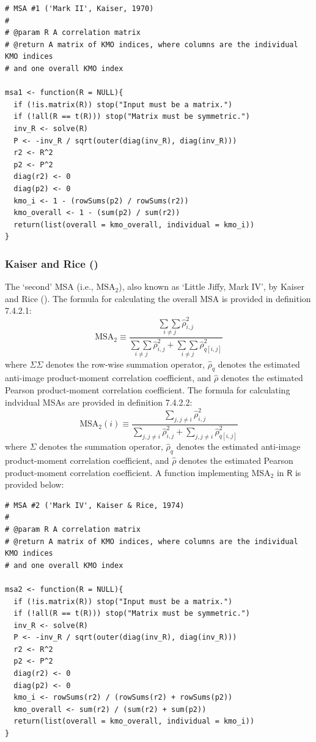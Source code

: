 \documentclass[
  10pt,
  a4paper,
  twoside]{article}
\begin{document}
\begin{verbatim}
# MSA #1 ('Mark II', Kaiser, 1970)
#
# @param R A correlation matrix
# @return A matrix of KMO indices, where columns are the individual KMO indices
# and one overall KMO index

msa1 <- function(R = NULL){
  if (!is.matrix(R)) stop("Input must be a matrix.")
  if (!all(R == t(R))) stop("Matrix must be symmetric.")
  inv_R <- solve(R)
  P <- -inv_R / sqrt(outer(diag(inv_R), diag(inv_R)))
  r2 <- R^2
  p2 <- P^2
  diag(r2) <- 0
  diag(p2) <- 0
  kmo_i <- 1 - (rowSums(p2) / rowSums(r2))
  kmo_overall <- 1 - (sum(p2) / sum(r2))
  return(list(overall = kmo_overall, individual = kmo_i))
}
\end{verbatim}

\subsubsection{\texorpdfstring{Kaiser and Rice ()}{Kaiser and Rice (1974)}}\label{sec:sec_msa_kaiserandrice1974_appendix}

The `second' MSA (i.e., \(\text{MSA}_2\)), also known as `Little Jiffy, Mark IV', by Kaiser and Rice (). The formula for calculating the overall MSA is provided in definition 7.4.2.1:
\[
\text{MSA}_2 \equiv \frac{
\underset{i \neq j}{\sum \sum} \hat{\rho}^2_{i,j}
}{
\underset{i \neq j}{\sum \sum} \hat{\rho}^2_{i,j} + 
\underset{i \neq j}{\sum \sum} \hat{\rho}^2_{q[i,j]}
} \tag{7.4.2.1}
\]
where \(\Sigma \Sigma\) denotes the row-wise summation operator, \(\hat{\rho}_{q}\) denotes the estimated anti-image product-moment correlation coefficient, and \(\hat{\rho}\) denotes the estimated Pearson product-moment correlation coefficient. The formula for calculating indvidual MSAs are provided in definition 7.4.2.2:
\[
\text{MSA}_2(i) \equiv \frac{
\sum_{j, j \neq i} \hat{\rho}^2_{i,j}
}{
\sum_{j, j \neq i} \hat{\rho}^2_{i,j} +
\sum_{j, j \neq i} \hat{\rho}^2_{q[i,j]}
}  \tag{7.4.2.2}
\]
where \(\Sigma\) denotes the summation operator, \(\hat{\rho}_{q}\) denotes the estimated anti-image product-moment correlation coefficient, and \(\hat{\rho}\) denotes the estimated Pearson product-moment correlation coefficient. A function implementing \(\text{MSA}_2\) in \(\textsf{R}\) is provided below:

\begin{verbatim}
# MSA #2 ('Mark IV', Kaiser & Rice, 1974)
#
# @param R A correlation matrix
# @return A matrix of KMO indices, where columns are the individual KMO indices
# and one overall KMO index

msa2 <- function(R = NULL){
  if (!is.matrix(R)) stop("Input must be a matrix.")
  if (!all(R == t(R))) stop("Matrix must be symmetric.")
  inv_R <- solve(R)
  P <- -inv_R / sqrt(outer(diag(inv_R), diag(inv_R)))
  r2 <- R^2
  p2 <- P^2
  diag(r2) <- 0
  diag(p2) <- 0
  kmo_i <- rowSums(r2) / (rowSums(r2) + rowSums(p2))
  kmo_overall <- sum(r2) / (sum(r2) + sum(p2))
  return(list(overall = kmo_overall, individual = kmo_i))
}
\end{verbatim}
\end{document}
